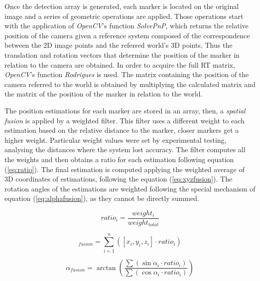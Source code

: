 \documentclass{styles/svproc}
\begin{document}
	Once the detection array is generated, each marker is located on the original image and a series of geometric operations are applied. Those operations start with the application of \textit{OpenCV}'s function \textit{SolvePnP}, which returns the relative position of the camera given a reference system composed of the correspondence between the 2D image points and the referred world's 3D points. Thus the translation and rotation vectors that determine the position of the marker in relation to the camera are obtained. In order to acquire the full RT matrix, \textit{OpenCV}'s function \textit{Rodrigues} is used. The matrix containing the position of the camera referred to the world is obtained by multiplying the calculated matrix and the matrix of the position of the marker in relation to the world.
	
	The position estimations for each marker are stored in an array, then, a \textit{spatial fusion} is applied by a weighted filter. This filter uses a different weight to each estimation based on the relative distance to the marker, closer markers get a higher weight. Particular weight values were set by experimental testing, analysing the distances where the system lost accuracy. The filter computes all the weights and then obtains a ratio for each estimation following equation (\ref{eq:ratio}). The final estimation is computed applying the weighted average of 3D coordinates of estimations, following the equation (\ref{eq:xyzfusion}). The rotation angles of the estimations are weighted following the special mechanism of equation (\ref{eq:alphafusion}), as they cannot be directly summed.
	
	\begin{equation}
	ratio_{i} = \frac{weight_{i}}{weight_{total}}
	\label{eq:ratio}
	\end{equation}
	
	\begin{equation}
	[x,y,z]_{fusion} = \sum_{i=1}^{n} ([x_{i},y_{i},z_{i}] \cdot ratio_{i})
	\label{eq:xyzfusion}
	\end{equation}
	
	\begin{equation}
	\alpha_{fusion} = \arctan \left( \frac{ \sum ( \sin \alpha_{i} \cdot ratio_{i} ) }{ \sum ( \cos \alpha_{i} \cdot ratio_{i} ) } \right)
	\label{eq:alphafusion}
	\end{equation}
	
	

	
\end{document}
